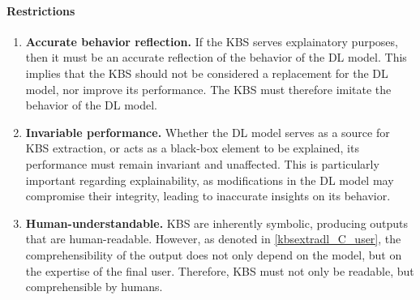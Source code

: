 \paragraph{Restrictions}
\begin{enumerate} [start=1,label={\bfseries R\arabic*.}]
    \item \textbf{Accurate behavior reflection.} \label{kbsextradl_R_behavior} If the KBS serves explainatory purposes, then it must be an accurate reflection of the behavior of the DL model. This implies that the KBS should not be considered a replacement for the DL model, nor improve its performance. The KBS must therefore imitate the behavior of the DL model.
    
    \item \textbf{Invariable performance.} \label{kbsextradl_R_performance} Whether the DL model serves as a source for KBS extraction, or acts as a black-box element to be explained, its performance must remain invariant and unaffected. This is particularly important regarding explainability, as modifications in the DL model may compromise their integrity, leading to inaccurate insights on its behavior. 
    
    \item \textbf{Human-understandable.} \label{kbsextradl_R_human} KBS are inherently symbolic, producing outputs that are human-readable. However, as denoted in \ref{kbsextradl_C_user}, the comprehensibility of the output does not only depend on the model, but on the expertise of the final user. Therefore, KBS must not only be readable, but comprehensible by humans.
\end{enumerate}

